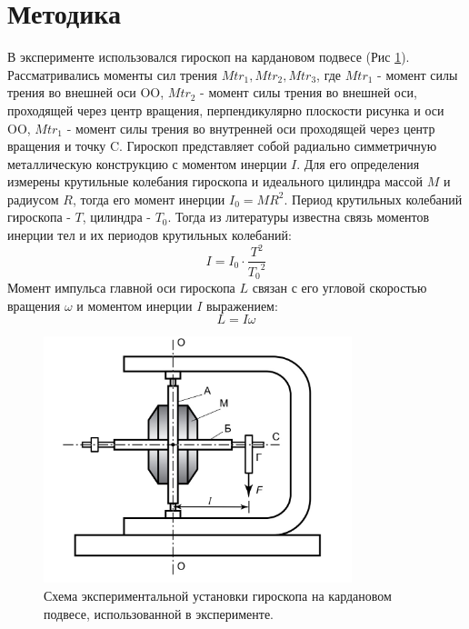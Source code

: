 \documentclass[12pt]{article}
\begin{document}
\section{Методика}
В эксперименте использовался гироскоп на кардановом подвесе (Рис \ref{fig:1}). Рассматривались моменты сил трения 
$Mtr_1, Mtr_2, Mtr_3$, где $Mtr_1$ - момент силы трения во внешней оси OO, $Mtr_2$ - момент силы трения во внешней оси, проходящей через центр 
вращения, перпендикулярно плоскости рисунка и оси OO, $Mtr_1$ - момент силы трения во внутренней оси проходящей через центр вращения и точку C.
Гироскоп представляет собой радиально симметричную металлическую конструкцию с моментом инерции $I$. Для его определения измерены крутильные колебания
гироскопа и идеального цилиндра массой $M$ и радиусом $R$, тогда его момент инерции $I_0 = MR^2$. Период крутильных колебаний гироскопа - $T$, 
цилиндра - $T_0$. Тогда из литературы\cite{LabBook} известна связь моментов инерции тел и их периодов крутильных колебаний:
\begin{equation}\label{eq:1}
    I = I_0 \cdot \frac{T^2}{{T_0}^2}
\end{equation}
Момент импульса главной оси гироскопа $L$ связан с его угловой скоростью вращения $\omega$ и моментом инерции $I$ выражением:
\begin{equation}\label{eq:2}
    L = I\omega
\end{equation}
\begin{figure}
    \begin{center}
        \includegraphics[width=0.8\textwidth]{fig1}
    \end{center}
    \caption{Схема экспериментальной установки гироскопа на кардановом подвесе, использованной в эксперименте.}
    \label{fig:1}
\end{figure}
\end{document}
